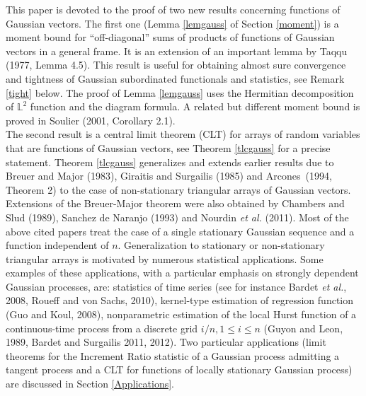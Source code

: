 \documentclass[10pt]{article}
\def\L{\mathbb{L}}
\begin{document}
This paper is devoted to the proof of two new results concerning functions of Gaussian vectors.
The first one (Lemma \ref{lemgauss} of Section \ref{moment}) is a moment bound for ``off-diagonal'' sums of
products of functions of Gaussian vectors in a general frame. It is an extension of an important lemma by Taqqu (1977, Lemma 4.5).
This result is useful for obtaining almost sure convergence and tightness of Gaussian subordinated functionals
and statistics, see Remark \ref{tight}  below.
The proof of Lemma \ref{lemgauss} uses the Hermitian decomposition of $\L^2$ function and the diagram formula.
A related but different moment bound is proved in
Soulier (2001, Corollary 2.1). %
~\\

The second result is
a central limit
theorem (CLT) for arrays of random variables that are functions of Gaussian vectors, see Theorem \ref{tlcgauss} for a precise statement.
Theorem \ref{tlcgauss} generalizes and extends earlier results due to
Breuer and Major (1983), Giraitis and Surgailis (1985) and Arcones~(1994, Theorem 2)
to the case of non-stationary triangular arrays of Gaussian vectors. Extensions of the  Breuer-Major theorem were also obtained by Chambers and Slud (1989), Sanchez de Naranjo (1993) and
Nourdin {\it et al.} (2011).
Most of the above cited papers treat the case of a single stationary
Gaussian sequence and a function independent of $n$. Generalization to stationary or non-stationary triangular arrays
is motivated by numerous statistical applications. Some examples of these applications, with a particular emphasis on strongly dependent
Gaussian processes,
are: statistics of time series (see for instance Bardet {\it et al.}, 2008,   Roueff and von Sachs, 2010), %
kernel-type estimation of regression function (Guo and Koul, 2008),
nonparametric estimation of the local Hurst function of a continuous-time process %
from a discrete grid
$i/n, 1\le i \le n$
(Guyon and Leon, 1989, Bardet and Surgailis 2011, 2012).
Two particular applications (limit theorems for the Increment Ratio statistic of a Gaussian process admitting a tangent process and a CLT for functions of locally stationary Gaussian process) are discussed in Section \ref{Applications}. ~\\
\end{document}

